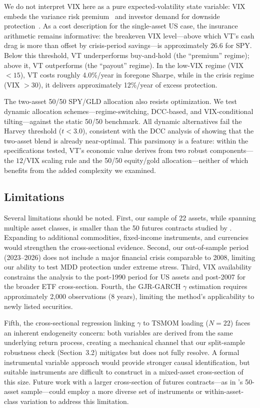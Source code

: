 We do not interpret VIX here as a pure expected-volatility state variable: VIX embeds the variance risk premium~\citep{bollerslev2009} and investor demand for downside protection~\citep{bondarenko2019}. As a cost description for the single-asset US case, the insurance arithmetic remains informative: the breakeven VIX level---above which VT's cash drag is more than offset by crisis-period savings---is approximately 26.6 for SPY. Below this threshold, VT underperforms buy-and-hold (the ``premium'' regime); above it, VT outperforms (the ``payout'' regime). In the low-VIX regime (VIX $< 15$), VT costs roughly 4.0\%/year in foregone Sharpe, while in the crisis regime (VIX $> 30$), it delivers approximately 12\%/year of excess protection.

The two-asset 50/50 SPY/GLD allocation also resists optimization. We test dynamic allocation schemes---regime-switching, DCC-based, and VIX-conditional tilting---against the static 50/50 benchmark. All dynamic alternatives fail the Harvey threshold ($t < 3.0$), consistent with the DCC analysis of \citet{lai2026a} showing that the two-asset blend is already near-optimal. This parsimony is a feature: within the specifications tested, VT's economic value derives from two robust components---the $12/\text{VIX}$ scaling rule and the 50/50 equity/gold allocation---neither of which benefits from the added complexity we examined.

\subsection{Limitations}

Several limitations should be noted. First, our sample of 22 assets, while spanning multiple asset classes, is smaller than the 50 futures contracts studied by \citet{hood2025}. Expanding to additional commodities, fixed-income instruments, and currencies would strengthen the cross-sectional evidence. Second, our out-of-sample period (2023--2026) does not include a major financial crisis comparable to 2008, limiting our ability to test MDD protection under extreme stress. Third, VIX availability constrains the analysis to the post-1990 period for US assets and post-2007 for the broader ETF cross-section. Fourth, the GJR-GARCH $\gamma$ estimation requires approximately 2,000 observations (8 years), limiting the method's applicability to newly listed securities.

Fifth, the cross-sectional regression linking $\gamma$ to TSMOM loading ($N = 22$) faces an inherent endogeneity concern: both variables are derived from the same underlying return process, creating a mechanical channel that our split-sample robustness check (Section~3.2) mitigates but does not fully resolve. A formal instrumental variable approach would provide stronger causal identification, but suitable instruments are difficult to construct in a mixed-asset cross-section of this size. Future work with a larger cross-section of futures contracts---as in \citet{hood2025}'s 50-asset sample---could employ a more diverse set of instruments or within-asset-class variation to address this limitation.



